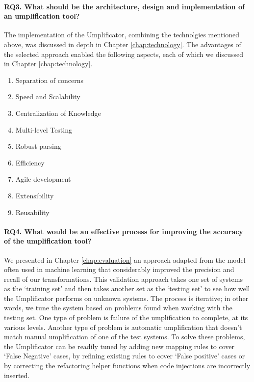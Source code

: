 \paragraph*{RQ3. What should be the architecture, design and implementation of an umplification tool?}

The implementation of the Umplificator, combining the technolgies mentioned above, was discussed in depth in Chapter \ref{chap:technology}. The advantages of the selected approach enabled the following aspects, each of which we discussed in Chapter \ref{chap:technology}.

\begin{enumerate}

\item Separation of concerns

\item Speed and Scalability

\item Centralization of Knowledge

\item Multi-level Testing

\item Robust parsing 

\item Efficiency

\item Agile development 

\item Extensibility

\item Reusability

\end{enumerate}

\paragraph*{RQ4. What would be an effective process for improving the accuracy of the umplification tool?}

We presented in Chapter \ref{chap:evaluation} an approach adapted from the model often used in machine learning that  considerably improved the precision and recall of our transformations. This validation approach takes one set of systems as the `training set' and then takes another set as the `testing set' to see how well the Umplificator performs on unknown systems. The process is iterative; in other words, we tune the system based on problems found when working with the testing set. 
One type of problem is  failure of the umplification to complete, at its various levels. Another type of problem is automatic umplification that doesn't match manual umplification of one of the test systems. To solve these problems, the Umplificator can be readily tuned by adding new mapping rules to cover `False Negative' cases, by refining existing rules to cover `False positive' cases or by correcting the refactoring helper functions when code injections are incorrectly inserted.

